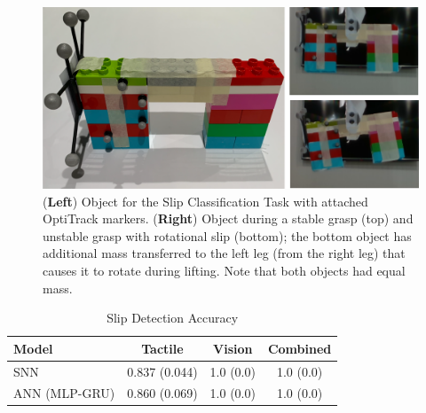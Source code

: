 \documentclass[fyp]{socreport}
\begin{document}
\begin{figure}
\centering
\includegraphics[width=0.95\columnwidth]{images/robotsetup/objects_exp2_small.png}
\caption{(\textbf{Left}) Object for the Slip Classification Task with attached
  OptiTrack markers. (\textbf{Right}) Object during a stable grasp (top) and
  unstable grasp with rotational slip (bottom); the bottom object has additional
  mass transferred to the left leg (from the right leg) that causes it to rotate
  during lifting. Note that both objects had equal
  mass.
}
\label{img:slips}
\end{figure}

\begin{table}
\centering
\caption{Slip Detection Accuracy}
\label{tbl:sdacc}
\begin{tabular}{l|ccc}
 \hline
 \hline
  \textbf{Model} & \textbf{Tactile} & \textbf{Vision} & \textbf{Combined} \\
  \hline
 SNN & 0.837 (0.044)  & 1.0 (0.0) & 1.0 (0.0) \\
 \hline
 ANN (MLP-GRU) & 0.860 (0.069) & 1.0 (0.0)  & 1.0 (0.0) \\
 \hline
 \hline
\end{tabular}
\end{table}
\end{document}
